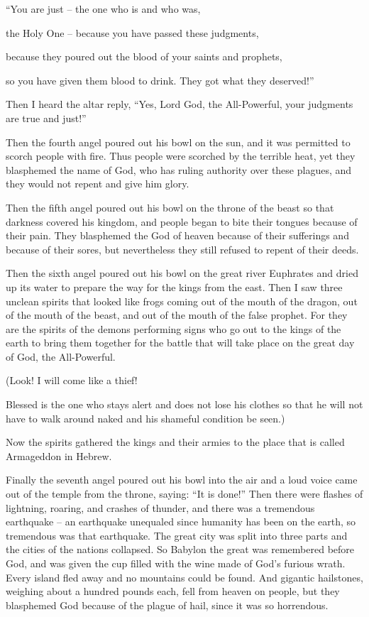{\par }{\Q “You are
just –
the one who is
and
who was,
\par }{\Q the Holy One
– because
you have passed
these
judgments,
\par }{\Q {}because
they poured out
the blood
of your saints
and
prophets,
\par }{\Q so
you have given
them
blood
to drink.
They got
what they deserved!”
\par }{\PP {}Then
I heard
the altar
reply, “Yes,
Lord
God,
the All-Powerful,
your
judgments
are true
and
just!”
\par }{\PP {}Then
the fourth
angel poured out
his
bowl
on
the sun,
and
it was permitted
to scorch
people
with
fire.
Thus
people
were scorched
by the terrible
heat,
yet
they blasphemed
the name
of God,
who has
ruling authority
over
these
plagues,
and
they would
not
repent
and give
him
glory.
\par }{\PP {}Then
the fifth
angel poured out
his
bowl
on
the throne
of the beast
so that
darkness
covered
his
kingdom,
and
people began to bite
their
tongues
because of
their pain.
They blasphemed
the God
of heaven
because of
their
sufferings
and
because of
their
sores,
but
nevertheless
they still refused to repent
of
their
deeds.
\par }{\PP {}Then
the sixth
angel poured out
his
bowl
on
the great
river
Euphrates
and
dried up
its
water
to
prepare
the way
for the kings
from
the east.
Then
I saw
three
unclean
spirits
that looked like
frogs
coming out
of the mouth
of the dragon,
out of
the mouth
of the beast,
and
out of
the mouth
of the false prophet.
For
they are
the spirits
of the demons
performing
signs
who
go out
to
the kings
of the earth
to bring them
together
for
the battle
that will take place on the great
day
of God,
the All-Powerful.
\par }{\Q {}(Look! I will come
like
a thief!
\par }{\Q Blessed
is the one who stays alert
and
does not lose
his
clothes
so that
he will
not
have to walk around
naked
and
his
shameful condition
be seen.)
\par }{\PP {}Now
the spirits gathered
the kings and their armies
to
the place
that is called
Armageddon
in Hebrew.
\par }{\PP {}Finally the seventh
angel poured out
his
bowl
into
the air
and
a loud
voice
came out
of
the temple
from
the throne,
saying: “It is done!”
Then
there were
flashes of lightning,
roaring,
and crashes of thunder,
and
there was
a tremendous
earthquake
– an earthquake
unequaled
since
humanity
has been
on
the earth,
so tremendous
was that earthquake.
The great
city
was split
into
three
parts
and
the cities
of the
nations
collapsed.
So
Babylon
the great
was remembered
before
God,
and was given
the
cup
filled with the wine
made of God’s
furious
wrath.
Every
island
fled away
and
no
mountains
could be found.
And
gigantic
hailstones,
weighing
about
a hundred pounds each,
fell
from
heaven
on
people,
but
they blasphemed
God
because of
the plague
of hail,
since it
was
so horrendous.

}
